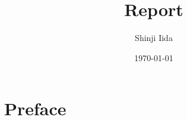 \documentclass[12pt, dvipdfmx]{article}
\theoremstyle{definition} %
\theoremstyle{remark}
\begin{document}
\title{Report}
\author{Shinji Iida}
\date{\today}
\maketitle
\sloppy

\section*{Preface}
%
% 
%
\end{document}
